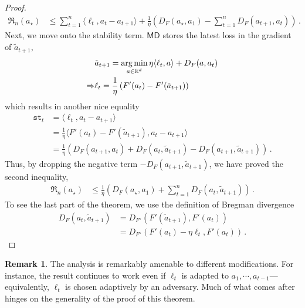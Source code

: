 \documentclass{article}
\theoremstyle{plain}
\theoremstyle{definition}
\newtheorem{remark}[theorem]{Remark}
\newcommand{\R}{\mathbb R}
\newcommand{\argmin}{\operatornamewithlimits{arg\,min}}
\newcommand{\Reg}{\mathfrak{R}}
\begin{document}
\begin{proof}
\begin{align*}
        \Reg_n(a_\star)
         & \leq
        \sum_{t=1}^{n} \langle \ell_t, a_t - a_{t+1} \rangle
        + \frac{1}{\eta}
        \left(
        D_F(a_\star, a_1) -
        \sum_{t=1}^{n} D_F(a_{t+1}, a_t)
        \right)\,.
    \end{align*}
    Next, we move onto the stability term.
    $\textsf{MD}$ stores the latest loss in the gradient of $\tilde{a}_{t+1}$,
    \begin{align*}
         & \tilde{a}_{t+1}  = \argmin_{a \in \R^d} \eta \langle \ell_t, a \rangle + D_F(a, a_t) \\
        \Rightarrow
         & \ell_t = \frac{1}{\eta}
        \left(
        F'(a_t) - F'(\tilde{a}_{t+1})
        \right)
    \end{align*}
    which results in another nice equality
    \begin{align*}
        \texttt{st}_t
         & = \langle \ell_t, a_{t} - a_{t+1} \rangle                                                                      \\
         & = \frac{1}{\eta} \langle F'(a_t) - F'(\tilde{a}_{t+1}), a_t - a_{t+1} \rangle                                  \\
         & = \frac{1}{\eta} \left(D_F(a_{t+1}, a_t) + D_F(a_t, \tilde{a}_{t+1}) - D_F(a_{t+1}, \tilde{a}_{t+1})\right)\,.
    \end{align*}
    Thus, by dropping the negative term $- D_F(a_{t+1}, \tilde{a}_{t+1})$,
    we have proved the second inequality,
    \begin{align*}
        \Reg_n(a_\star)
         & \leq
        \frac{1}{\eta}
        \left(
        D_F(a_\star, a_1) + \sum_{t=1}^{n} D_F(a_{t}, \tilde{a}_{t+1})
        \right)\,.
    \end{align*}
    To see the last part of the theorem, we use the definition of Bregman divergence
    \begin{align*}
        D_F(a_{t}, \tilde{a}_{t+1})
         & =D_{F^\star}\left(F'(\tilde{a}_{t+1}), F'(a_t)\right)       \\
         & = D_{F^\star}\left(F'(a_t) - \eta \ell_t, F'(a_t)\right)\,.
    \end{align*}
\end{proof}
\begin{remark}
    \label{rem:ellt-adapted}
    The analysis is remarkably amenable to different modifications.
    For instance, the result continues to work even if $\ell_t$ is adapted to $a_1, \cdots, a_{t-1}$---equivalently, $\ell_t$ is chosen adaptively by an adversary.
    Much of what comes after hinges on the generality of the proof of this theorem.
\end{remark}
\end{document}
